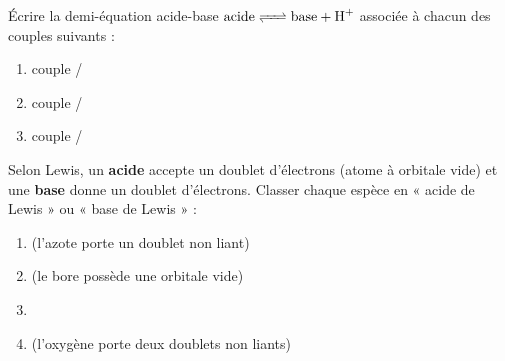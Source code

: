 \documentclass[11pt,a4paper]{article}
\begin{document}
\begin{exobox}
Écrire la demi-équation acide-base $\ce{acide <=> base + H+}$ associée à chacun des couples suivants :
\begin{enumerate}[label=\alph*),leftmargin=1.6em,itemsep=1pt]
  \item couple /
  \item couple /
  \item couple /
\end{enumerate}
\end{exobox}

\begin{exobox}
Selon Lewis, un \textbf{acide} accepte un doublet d'électrons (atome à orbitale vide) et une \textbf{base}
donne un doublet d'électrons. Classer chaque espèce en « acide de Lewis » ou « base de Lewis » :
\begin{enumerate}[label=\alph*),leftmargin=1.6em,itemsep=1pt]
  \item {} (l'azote porte un doublet non liant)
  \item {} (le bore possède une orbitale vide)
  \item {}
  \item {} (l'oxygène porte deux doublets non liants)
\end{enumerate}
\end{exobox}
\end{document}
